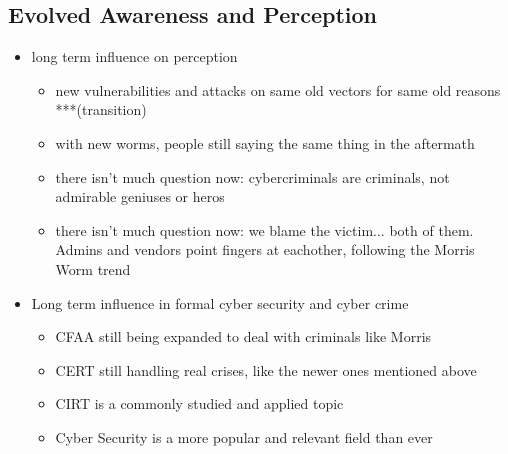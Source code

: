 \subsection*{Evolved Awareness and Perception}
\begin{itemize}
	\item long term influence on perception 
    	\begin{itemize}
        \item new vulnerabilities and attacks on same old vectors for same old reasons ***(transition)
    	\item with new worms, people still saying the same thing in the aftermath
    	\item there isn't much question now: cybercriminals are criminals, not admirable geniuses or heros
    	\item there isn't much question now: we blame the victim... both of them. 
              Admins and vendors point fingers at eachother, following the Morris Worm trend
    	\end{itemize}
	\item Long term influence in formal cyber security and cyber crime
    	\begin{itemize}
        \item CFAA still being expanded to deal with criminals like Morris
        \item CERT still handling real crises, like the newer ones mentioned above
        \item CIRT is a commonly studied and applied topic
        \item Cyber Security is a more popular and relevant field than ever
    	\end{itemize}
\end{itemize}